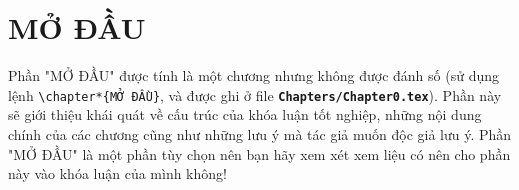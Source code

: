 
\chapter*{MỞ ĐẦU} %

\label{Chapter0} %


Phần "MỞ ĐẦU" được tính là một chương nhưng không được đánh số (sử dụng lệnh \verb|\chapter*{MỞ ĐẦU}|, và được ghi ở file \texttt{\bfseries Chapters/Chapter0.tex}). Phần này sẽ giới thiệu khái quát về cấu trúc của khóa luận tốt nghiệp, những nội dung chính của các chương cũng như những lưu ý mà tác giả muốn độc giả lưu ý. Phần "MỞ ĐẦU" là một phần tùy chọn nên bạn hãy xem xét xem liệu có nên cho phần này vào khóa luận của mình không!